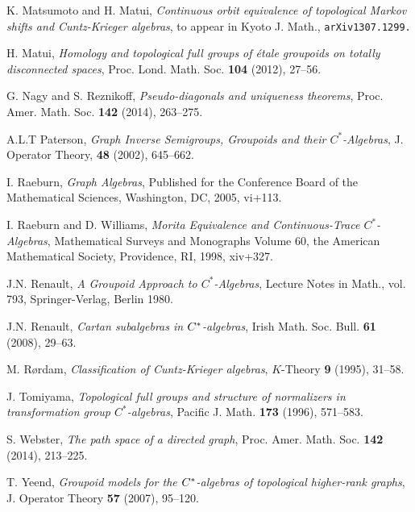 \documentclass[12pt, a4paper]{amsart}
\numberwithin{equation}{section}
\theoremstyle{definition}
\theoremstyle{remark}
\begin{document}
\begin{thebibliography}{20}
 K. Matsumoto and H. Matui, {\em Continuous orbit equivalence of topological Markov shifts and Cuntz-Krieger algebras}, to appear in Kyoto J. Math., \texttt{arXiv1307.1299.}

 H. Matui, {\em Homology and topological full groups of \'etale 
groupoids on totally disconnected spaces}, Proc. Lond. Math. Soc. {\bf 104} 
(2012), 27--56.

 G. Nagy and S. Reznikoff, {\em Pseudo-diagonals and uniqueness theorems}, Proc. Amer. Math. Soc. {\bf 142} (2014), 263--275. 

 A.L.T Paterson, {\em Graph Inverse Semigroups, Groupoids and their $C^*$-Algebras}, J. Operator Theory, {\bf 48} (2002), 645--662.

 I. Raeburn, {\em Graph Algebras}, Published for the Conference Board of the Mathematical Sciences, Washington, DC, 2005, vi+113.
    
 I. Raeburn and D. Williams, {\em Morita Equivalence and Continuous-Trace $C^*$-Algebras}, Mathematical Surveys and Monographs Volume 60, the American Mathematical Society, Providence, RI, 1998, xiv+327.
    	

 J.N. Renault, {\em A Groupoid Approach to $C^\ast$-Algebras}, Lecture Notes in Math., vol. 793, Springer-Verlag, Berlin 1980.

 J.N. Renault, {\em Cartan subalgebras in $C\sp *$-algebras}, Irish Math. Soc. Bull. {\bf 61} (2008), 29--63.

 M. R\o rdam, {\em Classification of Cuntz-Krieger algebras}, $K$-Theory {\bf 9} (1995), 31--58.

 J. Tomiyama, {\em Topological full groups and structure of normalizers in transformation group $C^\ast$-algebras}, Pacific J. Math. {\bf 173} (1996), 571--583.

 S. Webster, {\em The path space of a directed graph}, Proc. Amer. Math. Soc. {\bf 142} (2014), 213--225.

 T. Yeend, {\em Groupoid models for the $C\sp *$-algebras of topological higher-rank graphs}, J. Operator Theory {\bf 57} (2007), 95--120.
\end{thebibliography}
\end{document}
